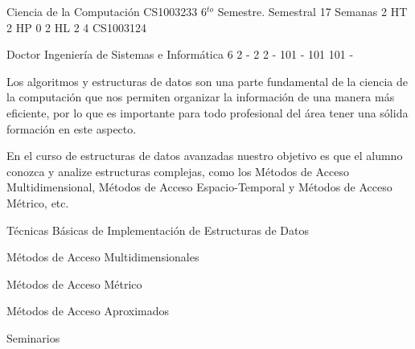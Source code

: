 \documentclass[a4paper,8pt]{article}
\begin{document}
\setNombreProfesor{}
\setGradoProfesorAbreviado{}
\sylabusHeader

\academicaTable
{Ciencia de la Computación} %
{CS1003233} %
{6$^{to}$ Semestre.} %
{Semestral} %
{17 Semanas} %
{2 HT} %
{2 HP} %
{0} %
{2 HL}  %
{2} %
{4} %
{CS1003124} %

\administrativaTable
{Doctor} %
{Ingeniería de Sistemas e Informática} %
{6} %
{2} %
{-} %
{2} %
{2} %
{-} %
{101} %
{-} %
{101} %
{101} %
{-} %


\begin{fundamentacion}
Los algoritmos y estructuras de datos son una parte fundamental de la ciencia de la computación que nos 
permiten organizar la información de una manera más eficiente, por lo que es importante para todo 
profesional del área tener una sólida formación en este aspecto.

En el curso de estructuras de datos avanzadas nuestro objetivo es que el alumno conozca y analize 
estructuras complejas, como los Métodos de Acceso Multidimensional, 
Métodos de Acceso Espacio-Temporal y Métodos de Acceso Métrico, etc.

\end{fundamentacion}

\begin{sumilla}
\item Técnicas Básicas de Implementación de Estructuras de Datos
\item Métodos de Acceso Multidimensionales
\item Métodos de Acceso Métrico
\item Métodos de Acceso Aproximados
\item Seminarios

\end{sumilla}

\begin{competenciasAsignatura}
\item {}
\item {}
\item {}

\end{competenciasAsignatura}
\end{document}

